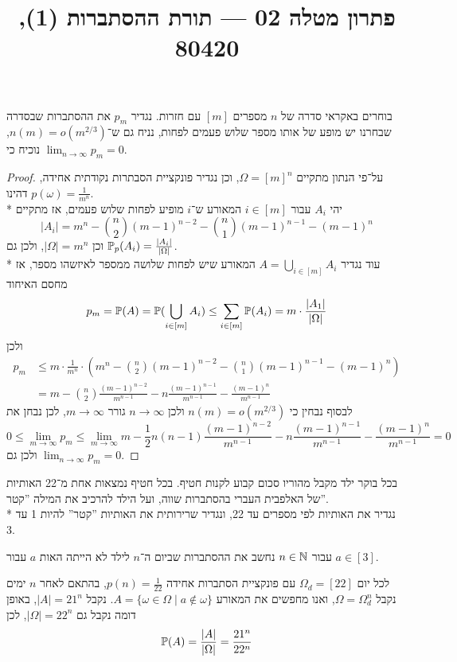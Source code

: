 
\title{פתרון מטלה 02 --- תורת ההסתברות (1), 80420}


\maketitle
\maketitleprint{}

\Question{}
בוחרים באקראי סדרה של $n$ מספרים $[m]$ עם חזרות. נגדיר $p_m$ את ההסתברות שבסדרה שבחרנו יש מופע של אותו מספר שלוש פעמים לפחות, נניח גם ש־$n(m) = o(m^{2/3})$, נוכיח כי $\lim_{n \to \infty} p_m = 0$.
\begin{proof}
	על־פי הנתון מתקיים $\Omega = {[m]}^n$, וכן נגדיר פונקציית הסבתרות נקודתית אחידה, דהינו $p(\omega) = \frac{1}{m^n}$. \\*
	יהי $A_i$ עבור $i \in [m]$ המאורע ש־$i$ מופיע לפחות שלוש פעמים, אז מתקיים
	\[
		|A_i| = m^n - \binom{n}{2} {(m - 1)}^{n - 2} - \binom{n}{1} {(m - 1)}^{n - 1} - {(m - 1)}^n
	\]
	וכן $|\Omega| = m^n$, ולכן גם $\mathbb{P}_p(A_i) = \frac{|A_i|}{|\Omega|}$. \\*
	עוד נגדיר $A = \bigcup_{i \in [m]} A_i$ המאורע שיש לפחות שלושה ממספר לאיזשהו מספר, אז מחסם האיחוד
	\[
		p_m
		= \mathbb{P}(A)
		= \mathbb{P}(\bigcup_{i \in [m]} A_i)
		\le \sum_{i \in [m]} \mathbb{P}(A_i)
		= m \cdot \frac{|A_1|}{|\Omega|}
	\]
	ולכן
	\begin{align*}
		p_m
		& \le m \cdot \frac{1}{m^n} \cdot (m^n - \binom{n}{2} {(m - 1)}^{n - 2} - \binom{n}{1} {(m - 1)}^{n - 1} - {(m - 1)}^n) \\
		& = m - \binom{n}{2} \frac{{(m - 1)}^{n - 2}}{m^{n - 1}} - n \frac{{(m - 1)}^{n - 1}}{m^{n - 1}} - \frac{{(m - 1)}^n}{m^{n - 1}}
	\end{align*}
	לבסוף נבחין כי $n(m) = o(m^{2/3})$ ולכן $n \to \infty$ גורר $m \to \infty$, לכן נבחן את
	\[
		0 \le \lim_{m \to \infty} p_m
		\le \lim_{m \to \infty} m - \frac{1}{2} n (n - 1) \frac{{(m - 1)}^{n - 2}}{m^{n - 1}} - n \frac{{(m - 1)}^{n - 1}}{m^{n - 1}} - \frac{{(m - 1)}^n}{m^{n - 1}}
		= 0
	\]
	ולכן גם $\lim_{n \to \infty} p_m = 0$.
\end{proof}

\Question{}
בכל בוקר ילד מקבל מהוריו סכום קבוע לקנות חטיף. בכל חטיף נמצאות אחת מ־22 האותיות של האלפבית העברי בהסתברות שווה, ועל הילד להרכיב את המילה ''קטר''. \\*
נגדיר את האותיות לפי מספרים עד 22, ונגדיר שרירותית את האותיות ''קטר'' להיות 1 עד 3.

\Subquestion{}
עבור $n \in \mathbb{N}$ נחשב את ההסתברות שביום ה־$n$ לילד לא הייתה האות $a$ עבור $a \in [3]$.
\begin{solution}
	לכל יום $\Omega_d = [22]$ עם פונקציית הסתברות אחידה $p(n) = \frac{1}{22}$, בהתאם לאחר $n$ ימים נקבל $\Omega = \Omega_d^n$, ואנו מחפשים את המאורע $A = \{ \omega \in \Omega \mid a \notin \omega\}$.
	נקבל $|A| = 21^n$, באופן דומה נקבל גם $|\Omega| = 22^n$, לכן
	\[
		\mathbb{P}(A) = \frac{|A|}{|\Omega|} = \frac{21^n}{22^n}
	\]
\end{solution}

